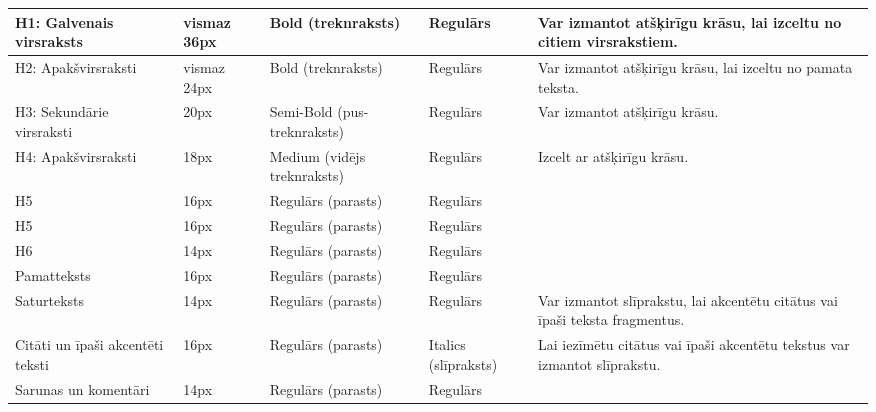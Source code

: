 \begin{tabularx}{\linewidth}{|X|X|X|X|X|}
	H1: Galvenais virsraksts                   & vismaz 36px     & Bold (treknraksts)          & Regulārs             & Var izmantot atšķirīgu krāsu, lai izceltu no citiem virsrakstiem.                \\ \hline
	H2: Apakšvirsraksti                        & vismaz 24px     & Bold (treknraksts)          & Regulārs             & Var izmantot atšķirīgu krāsu, lai izceltu no pamata teksta.                      \\ \hline
	H3: Sekundārie virsraksti                  & 20px            & Semi-Bold (pus-treknraksts) & Regulārs             & Var izmantot atšķirīgu krāsu.                                                    \\ \hline
	H4: Apakšvirsraksti                        & 18px            & Medium (vidējs treknraksts) & Regulārs             & Izcelt ar atšķirīgu krāsu.                                                       \\ \hline
	H5                                         & 16px            & Regulārs (parasts)          & Regulārs             &                                                                                  \\ \hline
	H5                                         & 16px            & Regulārs (parasts)          & Regulārs             &                                                                                  \\ \hline
	H6                                         & 14px            & Regulārs (parasts)          & Regulārs             &                                                                                  \\ \hline
	Pamatteksts                                & 16px            & Regulārs (parasts)          & Regulārs             &                                                                                  \\ \hline
	Saturteksts                                & 14px            & Regulārs (parasts)          & Regulārs             & Var izmantot slīprakstu, lai akcentētu citātus vai īpaši teksta fragmentus.      \\ \hline
	Citāti un īpaši akcentēti teksti           & 16px            & Regulārs (parasts)          & Italics (slīpraksts) & Lai iezīmētu citātus vai īpaši akcentētu tekstus var izmantot slīprakstu.        \\ \hline
	Sarunas un komentāri                       & 14px            & Regulārs (parasts)          & Regulārs             &                                                                                  \\ \hline

\end{tabularx}
